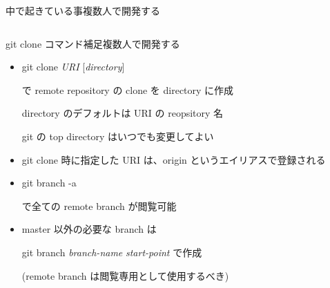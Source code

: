 \begin{frame}[t]{中で起きている事}{複数人で開発する}
\begin{columns}
\begin{column}{0.55\textwidth}
    \end{column}

  \end{columns}
  \vspace{2ex}






\end{frame}


\begin{frame}[t]{git clone コマンド補足}{複数人で開発する}

  \begin{itemize}
  \item git clone \textit{URI} [\textit{directory}]

    で remote repository の clone を directory に作成

    directory のデフォルトは URI の reopsitory 名

    git の top directory はいつでも変更してよい
    \vspace{2ex}

  \item git clone 時に指定した URI は、origin というエイリアスで登録される
    \vspace{2ex}

  \item git branch -a

    で全ての remote branch が閲覧可能
    \vspace{2ex}

  \item master 以外の必要な branch は

    git branch \textit{branch-name} \textit{start-point} で作成

    (remote branch は閲覧専用として使用するべき)
  \end{itemize}

\end{frame}
